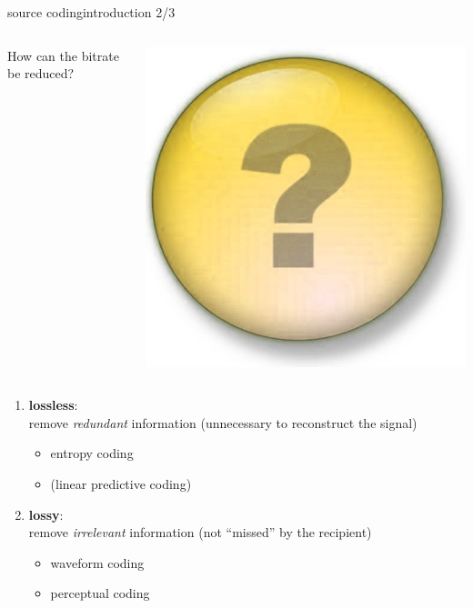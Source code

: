 	\begin{frame}{source coding}{introduction 2/3}
		\vspace{-12mm}
		\begin{columns}
			\column{5cm}
			How can the bitrate be reduced?
			
			\column{4cm}
			\begin{flushright}
				 \includegraphics[scale=.08]{Graph/question-mark}
			\end{flushright}
		\end{columns}
		\pause
		\begin{enumerate}
			\item	\textbf{lossless}:\\ remove \textit{redundant} information (unnecessary to reconstruct the signal)
				\begin{itemize}
					\item	entropy coding
					\item	(linear predictive coding)
				\end{itemize}
			\pause
            \bigskip
			\item	\textbf{lossy}:\\ remove \textit{irrelevant} information (not ``missed'' by the recipient)
				\begin{itemize}
					\item	waveform coding
					\item	perceptual coding
				\end{itemize}
		\end{enumerate}
	\end{frame}
